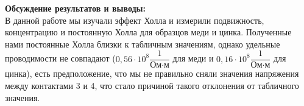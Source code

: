 \documentclass[a4paper, 12pt]{article}%
\begin{document}
\begin{enumerate}
	\end{enumerate}
	
	\textbf{Обсуждение результатов и выводы: }\\
	
	В данной работе мы изучали эффект Холла и измерили подвижность, концентрацию и постоянную Холла для образцов меди и цинка.
	Полученные нами постоянные Холла близки к табличным значениям, однако удельные проводимости не совпадают ($0,56 \cdot 10^8 \dfrac{1}{\text{Ом} \cdot \text{м}}$ для меди и $0,16 \cdot 10^8 \dfrac{1}{\text{Ом} \cdot \text{м}}$ для цинка), есть предположение, что мы не правильно сняли значения напряжения между контактами 3 и 4, что стало причиной такого отклонения от табличного значения.
	
	
	
	
	
	
	
	
	
	
	
	
	
	
	
	
	
	
	
	
	
	
	
	
	
	
	
	
\end{document}
